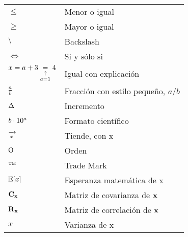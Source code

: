 \begin{longtable}{p{3cm}p{8.5cm}}
$\le$ & Menor o igual \\
$\ge$ & Mayor o igual \\
$\backslash$ & Backslash \\
$\iff$ & Si y sólo si \\
$x=a+3\underset{a=1}{\underset{\uparrow}{=}} 4 $& Igual con explicación \\
$\tfrac{a}{b}$ & Fracción con estilo pequeño, $a/b$ \\
$\Delta$ & Incremento \\
$b\cdot 10^{a}$ & Formato científico \\
$\xrightarrow[x]{}$ & Tiende, con x \\
$\mathrm{O}$ & Orden\\
$^{\text{\tiny{TM}}}$ & Trade Mark\\
$\mathbb{E}[x]$ & Esperanza matemática de x\\
$\mathbf{C}_{\mathbf{x}}$ & Matriz de covarianza de $\mathbf{x}$\\
$\mathbf{R}_{\mathbf{x}}$ & Matriz de correlación de $\mathbf{x}$\\
$\si{x}$ & Varianza de x \\


\end{longtable}
\newpage
%




